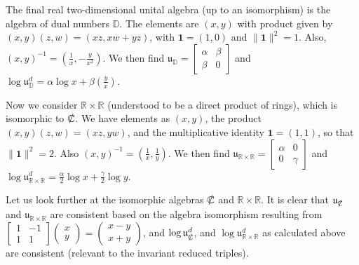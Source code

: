 \documentclass{amsart}
\theoremstyle{definition}
\numberwithin{theorem}{section}
\numberwithin{equation}{section}
\begin{document}
The final real two-dimensional unital algebra (up to an isomorphism) is the algebra of dual numbers $\mathbb{D}$.  The elements are $(x,y)$ with product given by $(x,y)(z,w) = (xz,xw+yz)$, with $\mathbf{1}=(1,0)$ and $\|\mathbf{1}\|^2 = 1$. Also, $(x,y)^{-1} = (\frac{1}{x},-\frac{y}{x^2})$.  We then find $\mathfrak{u}_\mathbb{D} = \left[\begin{array}{ccc}
 \alpha & \beta   \\ 
 \beta & 0    
\end{array}\right]$ and $\log  \mathfrak{u}^d_{\mathbb{D}} = \alpha\log x + \beta\left(\frac{y}{x}\right)$. 



   Now we consider $\mathbb{R}\times\mathbb{R}$ (understood to be a direct product of rings), which is isomorphic to $\slashed{\mathbb{C}}$.  We have elements as $(x,y)$, the product $(x,y)(z,w) = (xz,yw)$, and the multiplicative identity $\mathbf{1}=(1,1)$, so that $\|\mathbf{1}\|^2 = 2$.  Also $(x,y)^{-1} = (\frac{1}{x},\frac{1}{y})$.  We then find $\mathfrak{u}_{\mathbb{R}\times\mathbb{R}} = \left[\begin{array}{ccc}
 \alpha & 0   \\ 
 0 & \gamma    
\end{array}\right]$ and $\log  \mathfrak{u}^d_{\mathbb{R}\times\mathbb{R}} = \frac{\alpha}{2}\log x + \frac{\gamma}{2}\log y$. 



Let us look further at the isomorphic algebras $\slashed{\mathbb{C}}$ and $\mathbb{R}\times\mathbb{R}$.  It is clear that $\mathfrak{u}_{\slashed{\mathbb{C}}}$ and $\mathfrak{u}_{\mathbb{R}\times\mathbb{R}}$ are consistent based on the algebra isomorphism resulting from \\ $\left[\begin{array}{ccc}
 1 & -1   \\ 
 1 & 1    
\end{array}\right]\left(\begin{array}{ccc}
x   \\ 
y   
\end{array}\right) = \left(\begin{array}{ccc}
x-y   \\ 
x+y   
\end{array}\right)$, and $\log\mathfrak{u}^d_{\slashed{\mathbb{C}}}$, and $\log\mathfrak{u}^d_{\mathbb{R}\times\mathbb{R}}$ as calculated above are consistent (relevant to the invariant reduced triples).  
\end{document}
